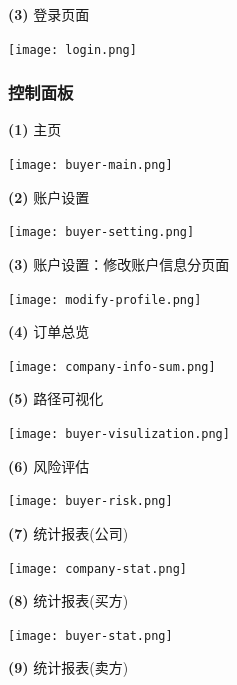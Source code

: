 \documentclass[12pt]{article}
\begin{document}
\noindent \textbf{(3)} 登录页面

\begin{center}
	\texttt{[image: login.png]}
\end{center}

\subsubsection{控制面板}

\noindent \textbf{(1)} 主页

\begin{center}
	\texttt{[image: buyer-main.png]}
\end{center}

\noindent \textbf{(2)} 账户设置

\begin{center}
	\texttt{[image: buyer-setting.png]}
\end{center}

\noindent \textbf{(3)} 账户设置：修改账户信息分页面

\begin{center}
	\texttt{[image: modify-profile.png]}
\end{center}

\noindent \textbf{(4)} 订单总览

\begin{center}
	\texttt{[image: company-info-sum.png]}
\end{center}

\noindent \textbf{(5)} 路径可视化

\begin{center}
	\texttt{[image: buyer-visulization.png]}
\end{center}

\noindent \textbf{(6)} 风险评估

\begin{center}
	\texttt{[image: buyer-risk.png]}
\end{center}

\noindent \textbf{(7)} 统计报表(公司)

\begin{center}
	\texttt{[image: company-stat.png]}
\end{center}

\noindent \textbf{(8)} 统计报表(买方)

\begin{center}
	\texttt{[image: buyer-stat.png]}
\end{center}

\newpage
\noindent \textbf{(9)} 统计报表(卖方)
\end{document}
